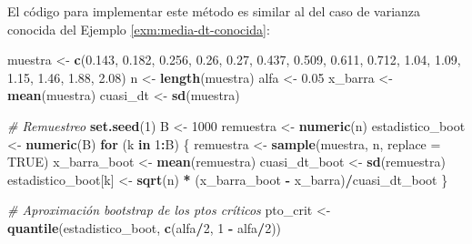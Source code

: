 \documentclass[]{book}
\newenvironment{Shaded}{\begin{snugshade}}{\end{snugshade}}
\newcommand{\KeywordTok}[1]{\textcolor[rgb]{0.13,0.29,0.53}{\textbf{#1}}}
\newcommand{\DataTypeTok}[1]{\textcolor[rgb]{0.13,0.29,0.53}{#1}}
\newcommand{\DecValTok}[1]{\textcolor[rgb]{0.00,0.00,0.81}{#1}}
\newcommand{\FloatTok}[1]{\textcolor[rgb]{0.00,0.00,0.81}{#1}}
\newcommand{\StringTok}[1]{\textcolor[rgb]{0.31,0.60,0.02}{#1}}
\newcommand{\CommentTok}[1]{\textcolor[rgb]{0.56,0.35,0.01}{\textit{#1}}}
\newcommand{\OtherTok}[1]{\textcolor[rgb]{0.56,0.35,0.01}{#1}}
\newcommand{\ControlFlowTok}[1]{\textcolor[rgb]{0.13,0.29,0.53}{\textbf{#1}}}
\newcommand{\OperatorTok}[1]{\textcolor[rgb]{0.81,0.36,0.00}{\textbf{#1}}}
\newcommand{\NormalTok}[1]{#1}
\theoremstyle{definition}
\theoremstyle{definition}
\theoremstyle{definition}
\theoremstyle{remark}
\begin{document}
El código para implementar este método es similar al del caso de
varianza conocida del Ejemplo \ref{exm:media-dt-conocida}:

\begin{Shaded}
\begin{Highlighting}[]
\NormalTok{muestra <-}\StringTok{ }\KeywordTok{c}\NormalTok{(}\FloatTok{0.143}\NormalTok{, }\FloatTok{0.182}\NormalTok{, }\FloatTok{0.256}\NormalTok{, }\FloatTok{0.26}\NormalTok{, }\FloatTok{0.27}\NormalTok{, }\FloatTok{0.437}\NormalTok{, }\FloatTok{0.509}\NormalTok{, }
             \FloatTok{0.611}\NormalTok{, }\FloatTok{0.712}\NormalTok{, }\FloatTok{1.04}\NormalTok{, }\FloatTok{1.09}\NormalTok{, }\FloatTok{1.15}\NormalTok{, }\FloatTok{1.46}\NormalTok{, }\FloatTok{1.88}\NormalTok{, }\FloatTok{2.08}\NormalTok{)}
\NormalTok{n <-}\StringTok{ }\KeywordTok{length}\NormalTok{(muestra)}
\NormalTok{alfa <-}\StringTok{ }\FloatTok{0.05}
\NormalTok{x_barra <-}\StringTok{ }\KeywordTok{mean}\NormalTok{(muestra)}
\NormalTok{cuasi_dt <-}\StringTok{ }\KeywordTok{sd}\NormalTok{(muestra)}

\CommentTok{# Remuestreo}
\KeywordTok{set.seed}\NormalTok{(}\DecValTok{1}\NormalTok{)}
\NormalTok{B <-}\StringTok{ }\DecValTok{1000}
\NormalTok{remuestra <-}\StringTok{ }\KeywordTok{numeric}\NormalTok{(n)}
\NormalTok{estadistico_boot <-}\StringTok{ }\KeywordTok{numeric}\NormalTok{(B)}
\ControlFlowTok{for}\NormalTok{ (k }\ControlFlowTok{in} \DecValTok{1}\OperatorTok{:}\NormalTok{B) \{}
\NormalTok{  remuestra <-}\StringTok{ }\KeywordTok{sample}\NormalTok{(muestra, n, }\DataTypeTok{replace =} \OtherTok{TRUE}\NormalTok{)}
\NormalTok{  x_barra_boot <-}\StringTok{ }\KeywordTok{mean}\NormalTok{(remuestra)}
\NormalTok{  cuasi_dt_boot <-}\StringTok{ }\KeywordTok{sd}\NormalTok{(remuestra)}
\NormalTok{  estadistico_boot[k] <-}\StringTok{ }\KeywordTok{sqrt}\NormalTok{(n) }\OperatorTok{*}\StringTok{ }\NormalTok{(x_barra_boot }\OperatorTok{-}\StringTok{ }\NormalTok{x_barra)}\OperatorTok{/}\NormalTok{cuasi_dt_boot}
\NormalTok{\}}

\CommentTok{# Aproximación bootstrap de los ptos críticos}
\NormalTok{pto_crit <-}\StringTok{ }\KeywordTok{quantile}\NormalTok{(estadistico_boot, }\KeywordTok{c}\NormalTok{(alfa}\OperatorTok{/}\DecValTok{2}\NormalTok{, }\DecValTok{1} \OperatorTok{-}\StringTok{ }\NormalTok{alfa}\OperatorTok{/}\DecValTok{2}\NormalTok{))}


\end{Highlighting}
\end{Shaded}
\end{document}
